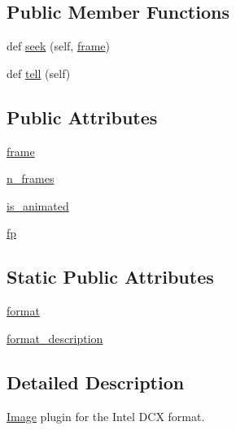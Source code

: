 \subsection*{Public Member Functions}
\begin{DoxyCompactItemize}
\item 
def \hyperlink{classPIL_1_1DcxImagePlugin_1_1DcxImageFile_aaa6e0d906883c984e5ebaf8871e66f22}{seek} (self, \hyperlink{classPIL_1_1DcxImagePlugin_1_1DcxImageFile_a2d47fb6544c5ac43aed6aa6ee8505c0d}{frame})
\item 
def \hyperlink{classPIL_1_1DcxImagePlugin_1_1DcxImageFile_ab927373560f4d20356085f430ad53fdf}{tell} (self)
\end{DoxyCompactItemize}
\subsection*{Public Attributes}
\begin{DoxyCompactItemize}
\item 
\hyperlink{classPIL_1_1DcxImagePlugin_1_1DcxImageFile_a2d47fb6544c5ac43aed6aa6ee8505c0d}{frame}
\item 
\hyperlink{classPIL_1_1DcxImagePlugin_1_1DcxImageFile_a8b98fc4ed9527cf58a179ccf6152b246}{n\+\_\+frames}
\item 
\hyperlink{classPIL_1_1DcxImagePlugin_1_1DcxImageFile_a9294f3ea5762cf44033c6db6324e4a95}{is\+\_\+animated}
\item 
\hyperlink{classPIL_1_1DcxImagePlugin_1_1DcxImageFile_adae309421e9812eae7c3592ebbfbba28}{fp}
\end{DoxyCompactItemize}
\subsection*{Static Public Attributes}
\begin{DoxyCompactItemize}
\item 
\hyperlink{classPIL_1_1DcxImagePlugin_1_1DcxImageFile_aec308e3cb77776b88a91c853c77b3b18}{format}
\item 
\hyperlink{classPIL_1_1DcxImagePlugin_1_1DcxImageFile_a2bfd828f6b6b5fcfde25435522d34dc8}{format\+\_\+description}
\end{DoxyCompactItemize}


\subsection{Detailed Description}
\hyperlink{namespacePIL_1_1Image}{Image} plugin for the Intel D\+CX format. 



